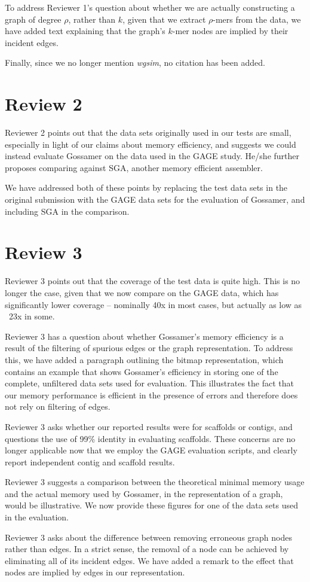 \documentclass{article}
\begin{document}
To address Reviewer 1's question about whether we are actually constructing a graph of degree $\rho$, rather than $k$, given that we extract $\rho$-mers from the data, we have added text explaining that the graph's $k$-mer nodes are implied by their incident edges.

Finally, since we no longer mention {\it wgsim}, no citation has been added.

\section*{Review 2}

Reviewer 2 points out that the data sets originally used in our tests are small, especially in light of our claims about memory efficiency, and suggests we could instead evaluate Gossamer on the data used in the GAGE study. He/she further proposes comparing against SGA, another memory efficient assembler.

We have addressed both of these points by replacing the test data sets in the original submission with the GAGE data sets for the 
evaluation of Gossamer, and including SGA in the comparison.

\section*{Review 3}

Reviewer 3 points out that the coverage of the test data is quite high. This is no longer the case, given that we now compare on the GAGE data, which has significantly lower coverage -- nominally 40x in most cases, but actually as low as ~23x in some.

Reviewer 3 has a question about whether Gossamer's memory efficiency is a result of the filtering of spurious edges or the graph representation. To address this, we have added a paragraph outlining the bitmap representation, which contains an example that shows Gossamer's efficiency in storing one of the complete, unfiltered data sets used for evaluation. This illustrates the fact that our memory performance is efficient in the presence of errors and therefore does not rely on filtering of edges.

Reviewer 3 asks whether our reported results were for scaffolds or contigs, and questions the use of 99\% identity in evaluating scaffolds. These concerns are no longer applicable now that we employ the GAGE evaluation scripts, and clearly report independent contig and scaffold results.

Reviewer 3 suggests a comparison between the theoretical minimal memory usage and the actual memory used by Gossamer, in the representation of a graph, would be illustrative. We now provide these figures for one of the data sets used in the evaluation.

Reviewer 3 asks about the difference between removing erroneous graph nodes rather than edges. In a strict sense, the removal of a node can be achieved by eliminating all of its incident edges. We have added a remark to the effect that nodes are implied by edges in our representation.
\end{document}
